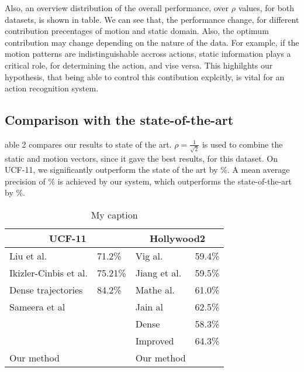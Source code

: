 Also, an overview distribution of the overall performance, over $\rho$ values, for both datasets, is shown in table.
We can see that, the performance change, for different contribution precentages of motion and static domain. Also, the optimum contribution may change
depending on the nature of the data. For example, if the motion patterns are indistinguishable accross actions, static information plays 
a critical role, for determining the action, and vise versa. This highilghts
our hypothesis, that being able to control this contibution explcitly, is vital for an action recognition system. 









\subsection{Comparison with the state-of-the-art}

able 2 compares our results to state of the art. $\rho = \frac{1}{\sqrt{2}}$ is used to combine the static and motion vectors,
since it gave the best results, for this dataset. On UCF-11, we significantly outperform 
the state of the art \cite{} by \%. A mean average precision of \% is achieved by our system, which outperforms
the state-of-the-art by \%. 

\begin{table}[]
\centering
\caption{My caption}
\label{my-label}
\begin{tabular}{|l|l||l|l|}
\hline
\multicolumn{2}{|c||}{UCF-11}    & \multicolumn{2}{c|}{Hollywood2} \\ \hline
Liu et al.            & 71.2\%  & Vig al.           & 59.4\%      \\ \hline
Ikizler-Cinbis et al. & 75.21\% & Jiang et al.      & 59.5\%      \\ \hline
Dense trajectories    & 84.2\%  & Mathe al.         & 61.0\%      \\ \hline
Sameera et al         &         & Jain al           & 62.5\%      \\ \hline
                      &         & Dense             & 58.3\%      \\ \hline
                      &         & Improved          & 64.3\%      \\ \hline \hline
Our method            &         & Our method        &             \\ \hline
\end{tabular}
\end{table}



